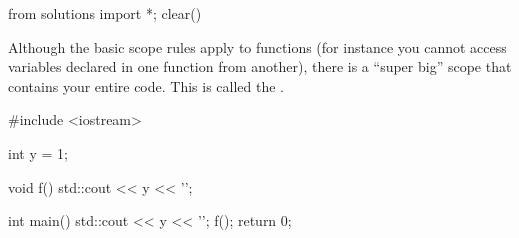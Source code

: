 \begin{python0}
from solutions import *; clear()
\end{python0}

Although the basic scope rules apply to functions (for instance you cannot access variables declared in one function from another), there is a ``super big'' scope that contains your entire code. This is called the .

\begin{consolethree}[escapeinside=||]
#include <iostream>

int y = 1;

void f()
{
    std::cout << y << '\n';
}

int main()
{
    std::cout << y << '\n';
    f();
    return 0;
}
\end{consolethree}



